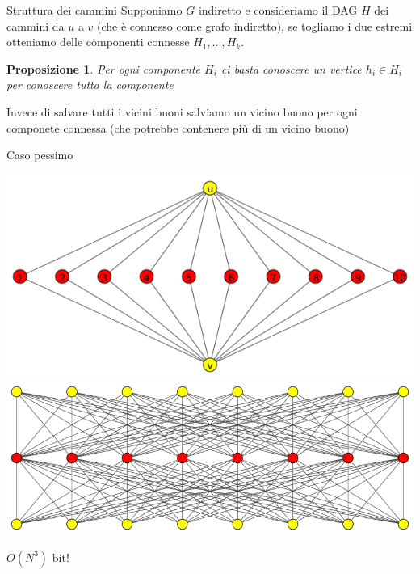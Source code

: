 \documentclass{beamer}
\newcounter{counter1}
\theoremstyle{plain}
\newtheorem{mypro}[counter1]{Proposizione}
\theoremstyle{definition}
\theoremstyle{remark}
\newcommand{\pa}[1]{\left(#1\right)}
\begin{document}
\begin{frame}{Struttura dei cammini}
  Supponiamo $G$ indiretto e consideriamo il DAG $H$ dei cammini da
  $u$ a $v$ (che \`e connesso come grafo indiretto), se togliamo i due
  estremi otteniamo delle componenti connesse $H_1,...,H_k$.

  \begin{mypro}
    Per ogni componente $H_i$ ci basta conoscere un vertice $h_i \in H_i$
    per conoscere tutta la componente
  \end{mypro}
  \vfill \pause

  Invece di salvare tutti i vicini buoni salviamo un vicino buono per
  ogni componete connessa (che potrebbe contenere più di un vicino
  buono)
\end{frame}

\begin{frame}{Caso pessimo}
      \begin{overprint}
         \includegraphics[width=\textwidth]{diamante}
         \includegraphics[width=\textwidth]{diamantemultiplo}
        \begin{center}
          $O\pa{N^3}$ bit!
        \end{center}
      \end{overprint}

\end{frame}
\end{document}
